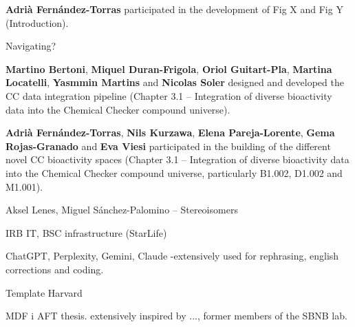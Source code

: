 

\textbf{Adrià Fernández-Torras} participated in the development of Fig X and Fig Y (Introduction).

Navigating?

\textbf{Martino Bertoni}, \textbf{Miquel Duran-Frigola}, \textbf{Oriol Guitart-Pla}, \textbf{Martina Locatelli}, \textbf{Yasmmin Martins} and \textbf{Nicolas Soler} designed and developed the CC data integration pipeline (Chapter 3.1 -- Integration of diverse bioactivity data into the Chemical Checker compound universe).

\textbf{Adrià Fernández-Torras}, \textbf{Nils Kurzawa}, \textbf{Elena Pareja-Lorente}, \textbf{Gema Rojas-Granado} and \textbf{Eva Viesi} participated in the building of the different novel CC bioactivity spaces (Chapter 3.1 -- Integration of diverse bioactivity data into the Chemical Checker compound universe, particularly B1.002, D1.002 and M1.001).


Aksel Lenes, Miguel Sánchez-Palomino -- Stereoisomers



IRB IT, BSC infrastructure (StarLife)


ChatGPT, Perplexity, Gemini, Claude -extensively used for rephrasing, english corrections and coding. 


Template Harvard

MDF i AFT thesis. extensively inspired by ..., former members of the SBNB lab. 